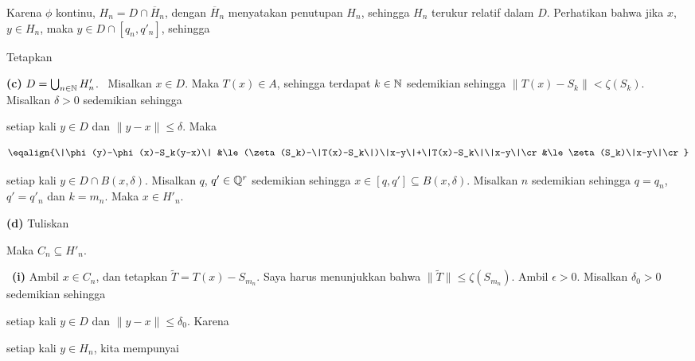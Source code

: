 {\noindent Karena $\phi$ kontinu, $H_n=D\cap\overline{H}_n$, dengan
$\overline{H}_n$ menyatakan penutupan $H_n$, sehingga $H_n$ terukur
relatif dalam $D$. Perhatikan bahwa jika $x$, $y\in H_n$, maka
$y\in D\cap[q_n,q'_n]$, sehingga



Tetapkan


\medskip

{\bf (c)} $D=\bigcup_{n\in\Bbb N}H'_n$.   \Prf\ Misalkan $x\in D$.
Maka $T(x)\in A$, sehingga terdapat $k\in\Bbb N$ sedemikian sehingga
$\|T(x)-S_k\|<\zeta(S_k)$. Misalkan $\delta>0$ sedemikian sehingga


\noindent setiap kali $y\in D$ dan $\|y-x\|\le\delta$.   Maka

$$\eqalign{\|\phi(y)-\phi(x)-S_k(y-x)\|
&\le(\zeta(S_k)-\|T(x)-S_k\|)\|x-y\|+\|T(x)-S_k\|\|x-y\|\cr
&\le\zeta(S_k)\|x-y\|\cr}$$

\noindent setiap kali $y\in D\cap B(x,\delta)$. Misalkan $q$,
$q'\in\Bbb Q^r$ sedemikian sehingga
$x\in[q,q']\subseteq B(x,\delta)$. Misalkan $n$ sedemikian sehingga
$q=q_n$, $q'=q'_n$ dan $k=m_n$. Maka $x\in H'_n$.\ \Qed

\medskip

{\bf (d)} Tuliskan


\noindent Maka $C_n\subseteq H'_n$.

\medskip

\Prf\ {\bf (i)} Ambil $x\in C_n$, dan tetapkan
$\tilde T=T(x)-S_{m_n}$. Saya harus menunjukkan bahwa
$\|\tilde T\|\le\zeta(S_{m_n})$. Ambil $\epsilon>0$. Misalkan
$\delta_0>0$ sedemikian sehingga


\noindent setiap kali $y\in D$ dan $\|y-x\|\le\delta_0$.   Karena


\noindent setiap kali $y\in H_n$, kita mempunyai


}
